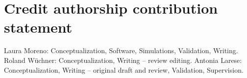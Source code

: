 \documentclass[11pt,english]{article}
\begin{document}
\section*{Credit authorship contribution statement}
Laura Moreno: Conceptualization, Software, Simulations, Validation, Writing. Roland Wüchner: Conceptualization, Writing – review 
editing. Antonia Larese: Conceptualization, Writing – original draft and review, Validation, Supervision.


 

    
\end{document}
